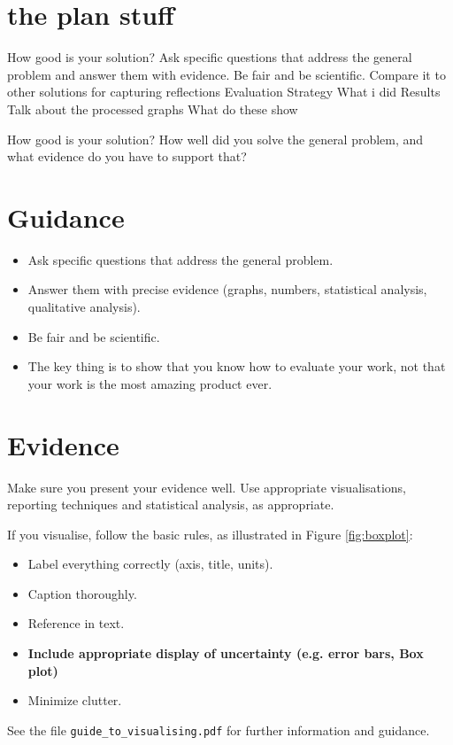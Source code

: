 \documentclass{l4proj}
\begin{document}
\section{the plan stuff}
How good is your solution?
Ask specific questions that address the general problem and answer them with evidence. 
Be fair and be scientific.
Compare it to other solutions for capturing reflections
Evaluation Strategy
What i did
Results
Talk about the processed graphs
What do these show

How good is your solution? How well did you solve the general problem, and what evidence do you 
have to support that?

\section{Guidance}
\begin{itemize}
    \item
        Ask specific questions that address the general problem.
    \item
        Answer them with precise evidence (graphs, numbers, statistical
        analysis, qualitative analysis).
    \item
        Be fair and be scientific.
    \item
        The key thing is to show that you know how to evaluate your work, not
        that your work is the most amazing product ever.
\end{itemize}

\section{Evidence}
Make sure you present your evidence well. Use appropriate visualisations, reporting techniques and statistical analysis, as appropriate.

If you visualise, follow the basic rules, as illustrated in Figure \ref{fig:boxplot}:
\begin{itemize}
\item Label everything correctly (axis, title, units).
\item Caption thoroughly.
\item Reference in text.
\item \textbf{Include appropriate display of uncertainty (e.g. error bars, Box plot)}
\item Minimize clutter.
\end{itemize}

See the file \texttt{guide\_to\_visualising.pdf} for further information and guidance.
\end{document}
